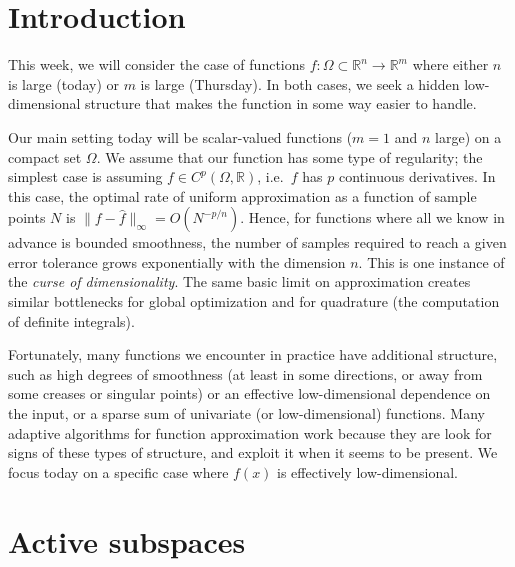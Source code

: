 \documentclass[12pt, leqno]{article} %
\begin{document}

\section{Introduction}


This week, we will consider the case of functions
$f : \Omega \subset \mathbb{R}^n \rightarrow \mathbb{R}^m$ where
either $n$ is large (today) or $m$ is large (Thursday).  In both
cases, we seek a hidden low-dimensional structure that makes the
function in some way easier to handle.

Our main setting today will be scalar-valued functions ($m = 1$ and
$n$ large) on a compact set $\Omega$.  We assume that our function has
some type of regularity; the simplest case is assuming $f \in
C^p(\Omega, \mathbb{R})$, i.e.~$f$ has $p$ continuous derivatives.  In
this case, the optimal rate of uniform approximation as a function of
sample points $N$ is $\|f-\hat{f}\|_\infty = O(N^{-p/n})$.  Hence, for
functions where all we know in advance is bounded smoothness, the
number of samples required to reach a given error tolerance grows
exponentially with the dimension $n$.  This is one instance of the
{\em curse of dimensionality}.  The same basic limit on approximation
creates similar bottlenecks for global optimization and for quadrature
(the computation of definite integrals).

Fortunately, many functions we encounter in practice have additional
structure, such as high degrees of smoothness (at least in some
directions, or away from some creases or singular points) or an
effective low-dimensional dependence on the input, or a sparse sum of
univariate (or low-dimensional) functions.  Many adaptive algorithms
for function approximation work because they are look for signs of
these types of structure, and exploit it when it seems to be present.
We focus today on a specific case where $f(x)$ is effectively
low-dimensional.

\section{Active subspaces}
\end{document}
